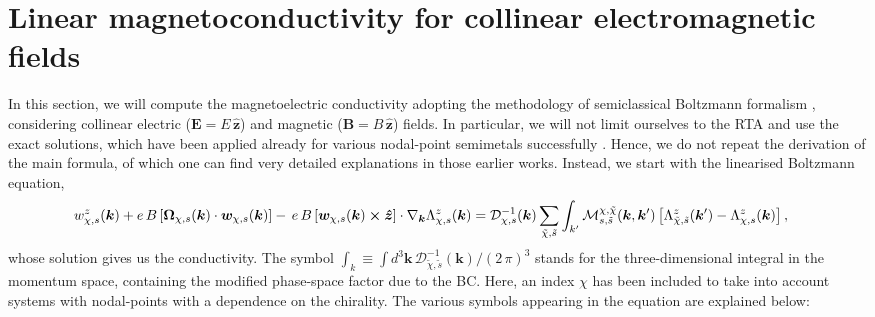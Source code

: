 \documentclass[aps,prb,onecolumn,nofootinbib,citeautoscript,10pt]{revtex4-2}
\begin{document}
\section{Linear magnetoconductivity for collinear electromagnetic fields } 
\label{secexact}

In this section, we will compute the magnetoelectric conductivity adopting the methodology of semiclassical Boltzmann formalism \cite{mermin, sundaram99_wavepacket, li2023_planar, ips-kush-review, ips-rsw-ph, ips-shreya, timm}, considering collinear electric ($ \boldsymbol E  =  E\, \boldsymbol{\hat{z}}$) and magnetic ($\boldsymbol B  =  B\, \boldsymbol{\hat{z}}$) fields. In particular, we will not limit ourselves to the RTA and use the exact solutions, which have been applied already for various nodal-point semimetals successfully \cite{timm, ips-exact-spin1, ips-exact-kwn, ips-exact-rsw}. Hence, we do not repeat the derivation of the main formula, of which one can find very detailed explanations in those earlier works. Instead, we start with the linearised Boltzmann equation,
\begin{align}
\label{eqvec}
&  w^z_{\chi, s} ({\boldsymbol k})
+ e \, B \left [
{\boldsymbol \Omega}_{\chi, s} ({\boldsymbol k})
 \cdot {\boldsymbol{w}}_{\chi, s} ({\boldsymbol k})  \right ]
-\, 
e \, B \left [ {\boldsymbol{w}}_{\chi, s} ({\boldsymbol k}) \cross   
\boldsymbol{\hat z}   \right ] 
\cdot \nabla_{\boldsymbol k} {\Lambda}^z_{\chi, s} (\boldsymbol {k} )  
 = {\mathcal D}^{-1}_{\chi, s}  ({\boldsymbol k})
\sum \limits_{\tilde \chi, \tilde s}
\int_{k'}
\mathcal{M}^{\chi, \tilde \chi}_{ s, \tilde s} (\boldsymbol k,\boldsymbol k^\prime)
\left[ 
 {\Lambda}^z_{ \tilde \chi, \tilde s} (\boldsymbol {k}^\prime ) 
 -  {\Lambda}^z_{\chi, s} (\boldsymbol {k} )  
 \right ],
\end{align}
whose solution gives us the conductivity. The symbol $\int_k \equiv \int d^{3}  \boldsymbol k  \, {\mathcal D}^{-1}_{\tilde \chi, \tilde s} ({\boldsymbol k} )/ (2\,\pi)^3 $ stands for the three-dimensional integral in the momentum space, containing the modified phase-space factor due to the BC. Here, an index $\chi$ has been included to take into account systems with nodal-points with a dependence on the chirality. The various symbols appearing in the equation are explained below:
\end{document}
